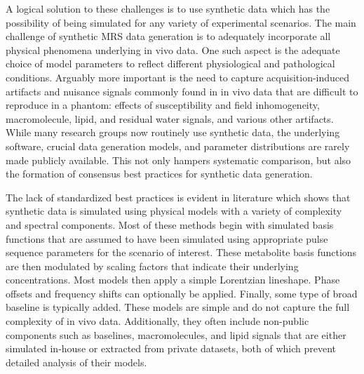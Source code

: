 A logical solution to these challenges is to use synthetic data which has the possibility of being simulated for any variety of experimental scenarios. The main challenge of synthetic MRS data generation is to adequately incorporate all physical phenomena underlying in vivo data. One such aspect is the adequate choice of model parameters to reflect different physiological and pathological conditions. Arguably more important is the need to capture acquisition-induced artifacts and nuisance signals commonly found in in vivo data that are difficult to reproduce in a phantom: effects of susceptibility and field inhomogeneity, macromolecule, lipid, and residual water signals, and various other artifacts. 
While many research groups now routinely use synthetic data, the underlying software, crucial data generation models, and parameter distributions are rarely made publicly available. This not only hampers systematic comparison, but also the formation of consensus best practices for synthetic data generation. 

The lack of standardized best practices is evident in literature which shows that synthetic data is simulated using physical models with a variety of complexity and spectral components.\cite{Hatami,Das2018a,Das2018,Iqbal2018a} Most of these methods begin with simulated basis functions that are assumed to have been simulated using appropriate pulse sequence parameters for the scenario of interest. These metabolite basis functions are then modulated by scaling factors that indicate their underlying concentrations. Most models then apply a simple Lorentzian lineshape.\cite{Hatami, Das2018a, Das2018} Phase offsets\cite{Das2018,Iqbal2018a} and frequency shifts\cite{Hatami} can optionally be applied. Finally, some type of broad baseline is typically added. These models are simple and do not capture the full complexity of in vivo data. Additionally, they often include non-public components such as baselines, macromolecules, and lipid signals that are either simulated in-house or extracted from private datasets, both of which prevent detailed analysis of their models.


